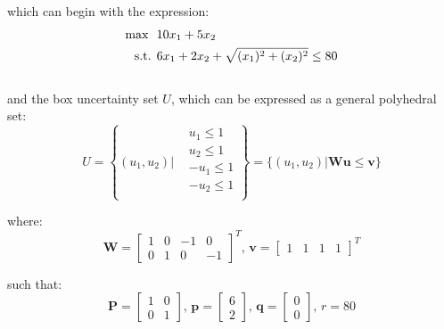 \documentclass{article}
\begin{document}
\break
which can begin with the expression:
\begin{equation}
\begin{split}
    \text{max \space} 
    & 10x_1 + 5x_2\\
    \text{s.t.\space}
    & \space 6x_1 + 2x_2 + \sqrt{(x_1)^2 + (x_2)^2} \leq 80
\end{split}
\end{equation}\\

and the box uncertainty set $U$, which can be expressed as a general polyhedral set:
\begin{equation}
    U = 
    \left\{ 
    (u_1, u_2) \Bigg|
        \begin{array}{lr}
            & u_1 \leq 1\\
            & u_2 \leq 1\\
            & -u_1 \leq 1\\
            & -u_2 \leq 1\\
        \end{array}
    \right\} = \{ (u_1, u_2) | \textbf{Wu} \leq \textbf{v} \}
\end{equation}

where:
\begin{equation}
    \textbf{W} = 
    \begin{bmatrix}
        1 & 0 & -1 & 0\\
        0 & 1 & 0 & -1
    \end{bmatrix}^T, \, \textbf{v} =  
    \begin{bmatrix}
        1 & 1 & 1 & 1
    \end{bmatrix}^T
\end{equation}

such that:
\begin{equation}
    \textbf{P} = \begin{bmatrix}
        1 & 0\\
        0 & 1
    \end{bmatrix}, \, \textbf{p} =  
    \begin{bmatrix}
        6\\
        2
    \end{bmatrix}, \, \textbf{q} = 
    \begin{bmatrix}
        0\\
        0
    \end{bmatrix}, \, r = 80
\end{equation}\\
\end{document}

